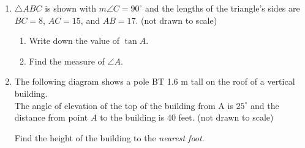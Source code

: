 \documentclass[12pt, twoside]{article}
\begin{document}
\begin{enumerate}
\newpage

\item $\triangle ABC$ is shown with $m\angle C=90^\circ$ and the lengths of the triangle's sides are $BC=8$, $AC=15$, and $AB=17$. (not drawn to scale)
  \begin{multicols}{2}
        \begin{enumerate}
        \item Write down the value of $\tan A$. \vspace{0.5cm}
        \item Find the measure of $\angle A$.  \vspace{1cm}
      \end{enumerate}
    \end{multicols} \vspace{2cm}

\item The following diagram shows a pole BT 1.6 m tall on the roof of a vertical building. \\[0.25cm]
  The angle of elevation of the top of the building from A is  
  $25^\circ$ and the distance from point $A$ to the building is 40 feet. (not drawn to scale)
    \begin{center}
      \end{center}
      Find the height of the building to the \emph{nearest foot}.

\end{enumerate}
\end{document}
